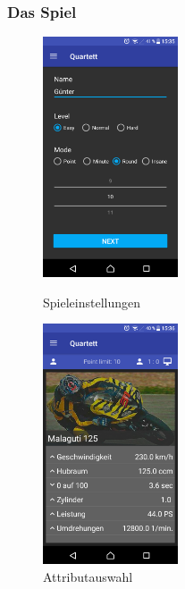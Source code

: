 \documentclass{scrartcl}
\begin{document}
\subsubsection{Das Spiel}
\begin{figure}[!ht]
  \centering
  \begin{minipage}{0.45\textwidth}
    \centering
    \includegraphics[width=4cm]{img/game_settings.png}
    \caption{Spieleinstellungen}
  \end{minipage}
  \hfill
  \begin{minipage}{0.45\textwidth}
    \centering
    \includegraphics[width=4cm]{img/game_attributes.png}
    \caption{Attributauswahl}
  \end{minipage}
\end{figure}
\end{document}
